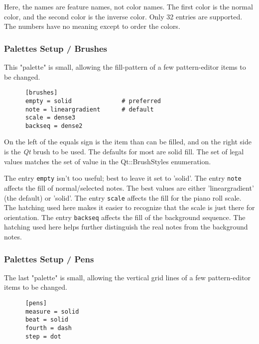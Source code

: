    Here, the names are feature names, not color names.  The first color is the
   normal color, and the second color is the inverse color.  Only 32 entries
   are supported. The numbers have no meaning except to order the colors.

\subsubsection{Palettes Setup / Brushes}
\label{subsubsec:palettes_setup_brushes}

   This "palette" is small, allowing the fill-pattern of a few pattern-editor
   items to be changed.

   \begin{verbatim}
      [brushes]
      empty = solid              # preferred
      note = lineargradient      # default
      scale = dense3
      backseq = dense2
   \end{verbatim}

   On the left of the equals sign is the item than can be filled, and on the
   right side is the \textsl{Qt} brush to be used.  The defaults for most are
   solid fill.
   The set of legal values matches the set
   of value in the Qt::BrushStyles enumeration.

   The entry \texttt{empty} isn't too useful; best to leave it set to 'solid'.
   The entry \texttt{note} affects the fill of normal/selected notes.
   The best values are either 'lineargradient' (the default) or 'solid'.
   The entry \texttt{scale} affects the fill for the piano roll scale.  The
   hatching used here makes it easier to recognize that the scale is just there
   for orientation.
   The entry \texttt{backseq} affects the fill of the background sequence.  The
   hatching used here helps further distinguish the real notes from the
   background notes.

\subsubsection{Palettes Setup / Pens}
\label{subsubsec:palettes_setup_brushes}

   The last "palette" is small, allowing the vertical grid lines
   of a few pattern-editor
   items to be changed.

   \begin{verbatim}
      [pens]
      measure = solid
      beat = solid
      fourth = dash
      step = dot
   \end{verbatim}

